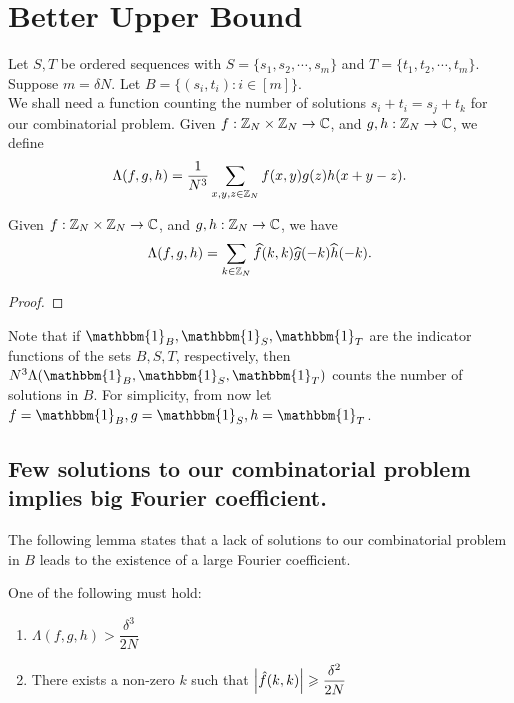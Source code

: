 \section{Better Upper Bound}
Let $ S, T $ be ordered sequences with $S = \{s_1, s_2, \cdots, s_m \}  $ and $ T = \{t_1, t_2, \cdots, t_m\} $. Suppose $ m = \delta N $.  Let $ B = \{(s_i,t_i): i \in [m] \} $.\\
We shall need a function counting the number of solutions $ s_i +t_i = s_j + t_k $ for our combinatorial problem. Given $ f : {\mathbb Z}_N \times {\mathbb Z}_N \rightarrow {\mathbb C} $, and $ g, h : {\mathbb Z}_N \rightarrow {\mathbb C} $, we define
$$ \Lambda(f,g,h) = \frac{1}{N^3} \sum\limits_{x,y,z \in {\mathbb Z}_N} f(x,y) g(z) h(x+y-z) .$$

\begin{lemma} \label{lem:to-Fourier}
	Given $ f : {\mathbb Z}_N \times {\mathbb Z}_N \rightarrow {\mathbb C} $, and $ g, h : {\mathbb Z}_N \rightarrow {\mathbb C} $, we have
	$$ \Lambda(f,g,h) = \sum\limits_{k \in {\mathbb Z}_N} \widehat{f}(k,k) \widehat{g}(-k) \widehat{h}(-k) .$$
\end{lemma}
\begin{proof}
\end{proof}

\noindent Note that if $ \mathbbm{1}_{B}, \mathbbm{1}_S, \mathbbm{1}_T $ are the indicator functions of the sets $ B, S, T $, respectively, then  $ N^3 \Lambda(\mathbbm{1}_B, \mathbbm{1}_S, \mathbbm{1}_T) $ counts the number of solutions in $ B $. For simplicity, from now let $ f = \mathbbm{1}_B, g = \mathbbm{1}_S, h = \mathbbm{1}_T $. 

\subsection{Few solutions to our combinatorial problem implies big Fourier coefficient.} The following lemma states that a lack of solutions to our combinatorial problem in $ B $ leads to the existence of a large Fourier coefficient.  
\begin{lemma} \label{lem:big-Fourier}
	One of the following must hold:
	\begin{enumerate}
		\item $ \Lambda(f,g,h) > \dfrac{\delta^3}{2N}$
		\item There exists a non-zero $ k $ such that $ \left\vert{\hat{f}(k,k)}\right\vert \geqslant \dfrac{\delta^2}{2N} $
	\end{enumerate}
\end{lemma}

